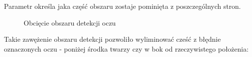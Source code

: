 \documentclass[10pt, a4paper]{article}
\begin{document}
Parametr określa jaka część obszaru zostaje pominięta z poszczególnych stron.

\begin{figure}[H]
    \begin{center}
        \hspace{8mm}
    \end{center}
    \caption{Obcięcie obszaru detekcji oczu}
    \label{fig:eye_crop}
\end{figure}

Takie zawężenie obszaru detekcji pozwoliło wyliminować cześć z błędnie oznaczonych oczu - poniżej środka twarzy czy w bok od rzeczywistego położenia:
\end{document}
